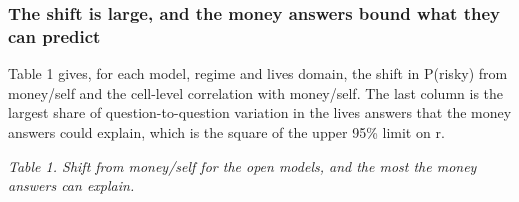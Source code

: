 \documentclass[
  11pt,
]{article}
\begin{document}
\hypertarget{the-shift-is-large-and-the-money-answers-bound-what-they-can-predict}{%
\subsubsection{The shift is large, and the money answers bound what they
can
predict}\label{the-shift-is-large-and-the-money-answers-bound-what-they-can-predict}}

Table 1 gives, for each model, regime and lives domain, the shift in
P(risky) from money/self and the cell-level correlation with money/self.
The last column is the largest share of question-to-question variation
in the lives answers that the money answers could explain, which is the
square of the upper 95\% limit on r.

\emph{Table 1. Shift from money/self for the open models, and the most
the money answers can explain.}
\end{document}
